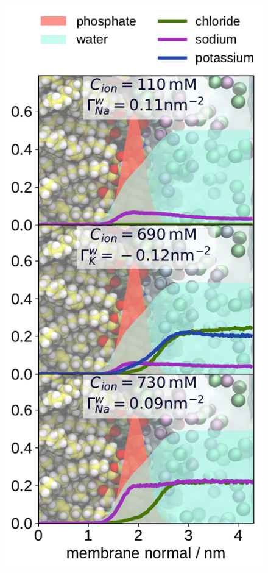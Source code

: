 \begin{figure}[tbp!] 
  \centering 
  \includegraphics[width=\figwidth]{../img/ecc_pops/density_profiles_na_k_cl_wat_phos_models-compar_4-6_NaCl-and-KCl-series.pdf}
  \caption{\label{fig:nacl-dens_PCPS} 
}
\end{figure}
